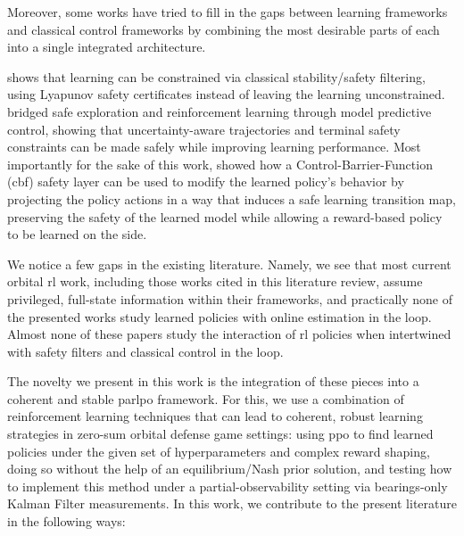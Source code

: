 Moreover, some works have tried to fill in the gaps between learning frameworks and classical control frameworks by combining the most desirable parts of each into a single integrated architecture.

\cite{berkenkamp2017safembrl} shows that learning can be constrained via classical stability/safety filtering, using Lyapunov safety certificates instead of leaving the learning unconstrained. \cite{koller2019safeexplorationrl} bridged safe exploration and reinforcement learning through model predictive control, showing that uncertainty-aware trajectories and terminal safety constraints can be made safely while improving learning performance. Most importantly for the sake of this work, \cite{emam2021saferlrcbf} showed how a Control-Barrier-Function (\acs{cbf}) safety layer can be used to modify the learned policy's behavior by projecting the policy actions in a way that induces a safe learning transition map, preserving the safety of the learned model while allowing a reward-based policy to be learned on the side.

We notice a few gaps in the existing literature. Namely, we see that most current orbital \acs{rl} work, including those works cited in this literature review, assume privileged, full-state information within their frameworks, and practically none of the presented works study learned policies with online estimation in the loop. Almost none of these papers study the interaction of \acs{rl} policies when intertwined with safety filters and classical control in the loop. 

The novelty we present in this work is the integration of these pieces into a coherent and stable \acs{parlpo} framework. For this, we use a combination of reinforcement learning techniques that can lead to coherent, robust learning strategies in zero-sum orbital defense game settings: using \acs{ppo} to find learned policies under the given set of hyperparameters and complex reward shaping, doing so without the help of an equilibrium/Nash prior solution, and testing how to implement this method under a partial-observability setting via bearings-only Kalman Filter measurements. In this work, we contribute to the present literature in the following ways:

